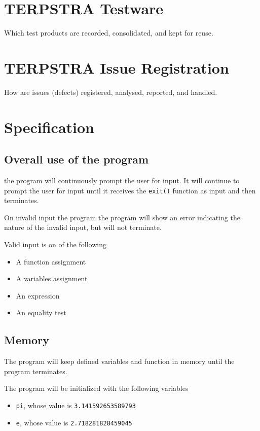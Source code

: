 \documentclass[11pt,a4paper]{article}
\begin{document}
\section{TERPSTRA Testware}
Which test products are recorded, consolidated, and kept for reuse.
\section{TERPSTRA Issue Registration}
How are issues (defects) registered, analysed, reported, and handled.

\appendix
\section{Specification} \label{app:specification}
\subsection{Overall use of the program}
the program will continuously prompt the user for input. It will
continue to prompt the user for input until it receives the
\texttt{exit()} function as input and then terminates.

On invalid input the program the program will show an error
indicating the nature of the invalid input, but will not terminate.

Valid input is on of the following
\begin{itemize}
\item A function assignment
\item A variables assignment
\item An expression
\item An equality test
\end{itemize}
\subsection{Memory}
The program will keep defined variables and function in memory
until the program terminates.


The program will be initialized with the following variables
\begin{itemize}
\item \texttt{pi}, whose value is \texttt{3.141592653589793}
\item \texttt{e}, whose value is \texttt{2.718281828459045}
\end{itemize}
\end{document}
